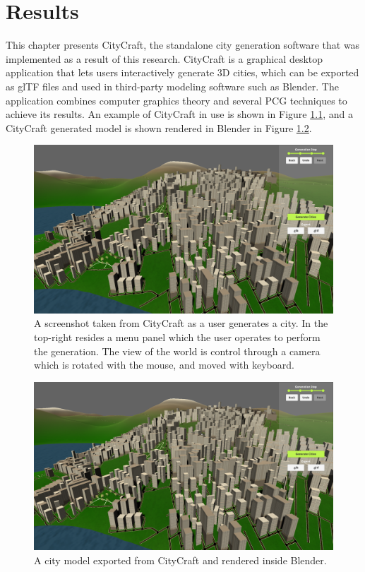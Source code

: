 \chapter{Results}

This chapter presents CityCraft, the standalone city generation software that was implemented as a result of this research.
CityCraft is a graphical desktop application that lets users interactively generate 3D cities, which can be exported as glTF files and used in third-party modeling software such as Blender.
The application combines computer graphics theory and several PCG techniques to achieve its results.
An example of CityCraft in use is shown in Figure \ref{fig:screenshot}, and a CityCraft generated model is shown rendered in Blender in Figure \ref{fig:blender}.

\begin{figure}[H]
  \centering
  \includegraphics[width=\textwidth]{figure/results/screenshot.png}

  \caption{A screenshot taken from CityCraft as a user generates a city. In the top-right resides a menu panel which the user operates to perform the generation. The view of the world is control through a camera which is rotated with the mouse, and moved with keyboard.}
  \label{fig:screenshot}
\end{figure}

\begin{figure}[H]
  \centering
  \includegraphics[width=\textwidth]{figure/results/screenshot.png}

  \caption{A city model exported from CityCraft and rendered inside Blender.}
  \label{fig:blender}
\end{figure}

